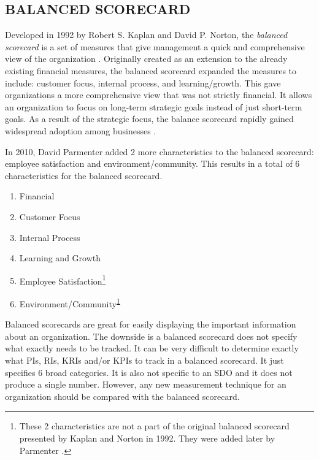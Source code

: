 \documentclass[SDSUThesis.tex]{subfiles}
\begin{document}
    \subsection{BALANCED SCORECARD}
    \label{sec:bsc}
    
        Developed in 1992 by Robert S. Kaplan and David P. Norton, the 
        \textit{balanced scorecard}  is a set of measures that
        give management a quick and comprehensive view of the
        organization \cite{kaplan1992}.  Originally created as an
        extension to the already existing financial measures, the
        balanced scorecard expanded the measures to include: 
        customer focus, internal process, and learning/growth. 
        This gave organizations a more comprehensive view that was
        not strictly financial.  It allows an organization to focus
        on long-term strategic goals instead of just short-term goals.
        As a result of the strategic focus, the balance scorecard
        rapidly gained widespread adoption
        among businesses \cite{Kaplan2007}.  
        
        In 2010, David Parmenter \cite{parmenter2010} added 2 more
        characteristics to the balanced scorecard: employee satisfaction
        and environment/community.  This results in a total of 6 
        characteristics for the balanced scorecard.
        \begin{enumerate}
          \item Financial 
          \item Customer Focus
          \item Internal Process
          \item Learning and Growth
          \item Employee Satisfaction\footnote{\label{ft:bsc} These 2 
                characteristics are not a part of the original balanced 
                scorecard presented by Kaplan and Norton in 1992.  
                They  were added later by Parmenter \cite{parmenter2010}. }
          \item Environment/Community\textsuperscript{\ref{ft:bsc}}
        \end{enumerate}
        
        Balanced scorecards are great for easily displaying the 
        important information about
        an organization.  The downside is a balanced scorecard does not specify what
        exactly needs to be tracked. It can be very difficult to determine exactly
        what PIs, RIs, KRIs and/or KPIs to track in a balanced scorecard. 
        It just specifies 6 broad categories.
        It is also not specific to an SDO and 
        it does not produce a single number.  However, any new measurement
        technique for an organization should be compared with the balanced
        scorecard.  
\end{document}
